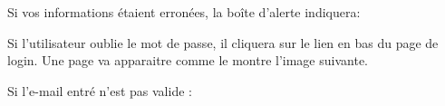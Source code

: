 \documentclass{article}
\begin{document}
\begin{enumerate}
Si vos informations étaient erronées, la boîte d'alerte indiquera:

\vspace{0.4cm}
   
\hspace*{-0.7in}

               \noindent{}

\newpage
	Si l'utilisateur oublie le mot de passe, il cliquera sur le lien en bas du page de login. Une page va apparaitre comme le montre l'image suivante.

\vspace{0.4cm}
\hspace*{-0.7in}
               \noindent{}


Si l'e-mail entré n'est pas valide :


\vspace{0.4cm}
\hspace*{-0.7in}
               \noindent{}




\end{enumerate}
\end{document}
